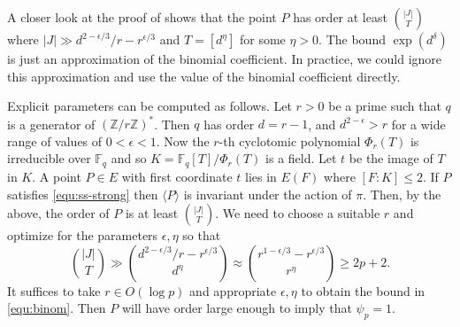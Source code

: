 \documentclass[12pt]{article}
\theoremstyle{plain}
\theoremstyle{definition}
\newcommand{\ang}[1]{\langle#1\rangle}
\newcommand{\abs}[1]{\left\vert#1\right\vert}
\def\Z{\ensuremath{\mathbb{Z}}}
\def\F{\ensuremath{\mathbb{F}}}
\begin{document}
A closer look at the proof of \cite[Theorem 1.1]{voloch2010} shows that the point $P$ has order at 
least $\binom{\abs{J}}{T}$ where $\abs{J} \gg d^{2 - \epsilon / 3} / r - r^{\epsilon / 3}$ and $T = 
[d^\eta]$ for some $\eta > 0$. The bound $\exp(d^\delta)$ is just an approximation of the binomial 
coefficient. In practice, we could ignore this approximation and use the value of the binomial 
coefficient directly. 

Explicit parameters can be computed as follows. Let $r > 0$ be a prime such that $q$ is a generator 
of $(\Z/r\Z)^*$. Then $q$ has order $d = r - 1$, and $d^{2 - \epsilon} > r$ for a wide range of 
values of $0 < \epsilon < 1$. Now the $r$-th cyclotomic polynomial $\Phi_r(T)$ is irreducible over 
$\F_q$ and so $K = \F_q[T]/\Phi_r(T)$ is a field. Let $t$ be the image of $T$ in $K$. A point $P 
\in E$ with first coordinate $t$ lies in $E(F)$ where $[F : K] \le 2$. If $P$ satisfies 
\eqref{equ:ss-strong} then $\ang{P}$ is invariant under the action of $\pi$. Then, by the above, 
the order of $P$ is at least $\binom{\abs{J}}{T}$. We need to choose a suitable $r$ and optimize 
for the parameters $\epsilon, \eta$ so that
\begin{equation}
	\label{equ:binom}
	\binom{\abs{J}}{T} \gg \binom{d^{2 - \epsilon / 3} / r - r^{\epsilon / 3}}{d^\eta} \approx 
	\binom{r^{1 - \epsilon / 3} - r^{\epsilon / 3}}{r^\eta} \ge 2p + 2.
\end{equation}
It suffices to take $r \in O(\log p)$ and appropriate $\epsilon, \eta$ to obtain the bound in 
\eqref{equ:binom}. Then $P$ will have order large enough to imply that $\psi_p = 1$. 
\end{document}
